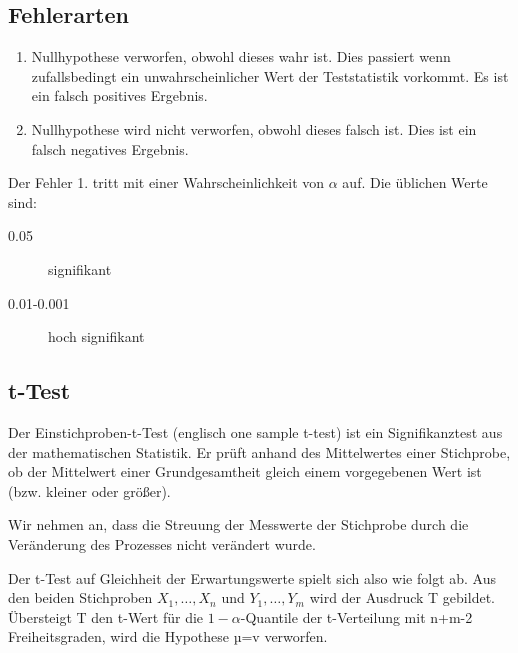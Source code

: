 \documentclass[../Main.tex]{subfiles}
\begin{document}
\subsection{Fehlerarten}
\begin{enumerate}
    \item Nullhypothese verworfen, obwohl dieses wahr ist. Dies passiert wenn zufallsbedingt ein unwahrscheinlicher Wert
    der Teststatistik vorkommt. Es ist ein falsch positives Ergebnis.
    \item Nullhypothese wird nicht verworfen, obwohl dieses falsch ist. Dies ist ein falsch negatives Ergebnis.
\end{enumerate}
Der Fehler 1. tritt mit einer Wahrscheinlichkeit von \(\alpha\) auf.
Die üblichen Werte sind:
\begin{description}
    \item[0.05] signifikant
    \item[0.01-0.001] hoch signifikant 
\end{description}

\subsection{t-Test}
Der Einstichproben-t-Test (englisch one sample t-test) ist ein Signifikanztest aus der mathematischen Statistik.
Er prüft anhand des Mittelwertes einer Stichprobe,
ob der Mittelwert einer Grundgesamtheit gleich einem vorgegebenen Wert ist (bzw. kleiner oder größer).


Wir nehmen an, dass die Streuung der Messwerte der Stichprobe durch die Veränderung des Prozesses
nicht verändert wurde.

Der t-Test auf Gleichheit der Erwartungswerte spielt sich also wie folgt ab. Aus den beiden
Stichproben \(X_1,\dots,X_n\) und \(Y_1,\dots,Y_m\) wird der Ausdruck T gebildet. Übersteigt T den
t-Wert für die \(1-\alpha\)-Quantile der t-Verteilung mit n+m-2 Freiheitsgraden, wird die Hypothese
µ=v verworfen.
\end{document}
